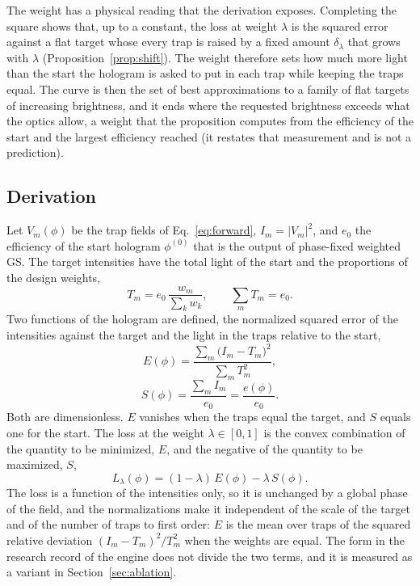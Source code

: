 The weight has a physical reading that the derivation exposes. Completing the square shows that, up to a constant, the loss at weight $\lambda$ is the squared error against a flat target whose every trap is raised by a fixed amount $\delta_\lambda$ that grows with $\lambda$ (Proposition~\ref{prop:shift}).
The weight therefore sets how much more light than the start the hologram is asked to put in each trap while keeping the traps equal. The curve is then the set of best approximations to a family of flat targets of increasing brightness, and it ends where the requested brightness exceeds what the optics allow, a weight that the proposition computes
from the efficiency of the start and the largest efficiency reached (it restates that measurement and is not a prediction).

\subsection{Derivation}\label{sec:derivation}

Let $V_m(\phi)$ be the trap fields of Eq.~\ref{eq:forward}, $I_m=|V_m|^2$, and $e_0$ the efficiency of the start hologram $\phi^{(0)}$ that is the output of phase-fixed weighted GS. The target intensities have the total light of the start and the proportions of the design weights,
\begin{equation}
T_m=e_0\,\frac{w_m}{\sum_kw_k},\qquad \sum_mT_m=e_0.\label{eq:target}
\end{equation}
Two functions of the hologram are defined, the normalized squared error of the intensities against the target and the light in the traps relative to the start,
\begin{equation}
E(\phi)=\frac{\sum_m\big(I_m-T_m\big)^2}{\sum_mT_m^2},\label{eq:E}
\end{equation}
\begin{equation}
S(\phi)=\frac{\sum_mI_m}{e_0}=\frac{e(\phi)}{e_0}.\label{eq:S}
\end{equation}
Both are dimensionless. $E$ vanishes when the traps equal the target, and $S$ equals one for the start. The loss at the weight $\lambda\in[0,1]$ is the convex combination of the quantity to be minimized, $E$, and the negative of the quantity to be maximized, $S$,
\begin{equation}
L_\lambda(\phi)=(1-\lambda)\,E(\phi)-\lambda\,S(\phi).\label{eq:loss}
\end{equation}
The loss is a function of the intensities only, so it is unchanged by a global phase of the field, and the normalizations make it independent of the scale of the target and of the number of traps to first order: $E$ is the mean over traps of the squared relative deviation $(I_m-T_m)^2/T_m^2$ when the weights are equal.
The form in the research record of the engine does not divide the two terms, and it is measured as a variant in Section~\ref{sec:ablation}.

